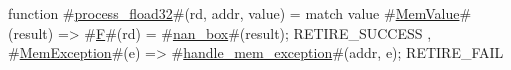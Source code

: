 function #\hyperref[sailRISCVzprocesszyfload32]{process\_fload32}#(rd, addr, value) =
  match value {
    #\hyperref[sailRISCVzMemValue]{MemValue}#(result) => { #\hyperref[sailRISCVzF]{F}#(rd) = #\hyperref[sailRISCVznanzybox]{nan\_box}#(result); RETIRE_SUCCESS },
    #\hyperref[sailRISCVzMemException]{MemException}#(e)  => { #\hyperref[sailRISCVzhandlezymemzyexception]{handle\_mem\_exception}#(addr, e); RETIRE_FAIL }
  }
